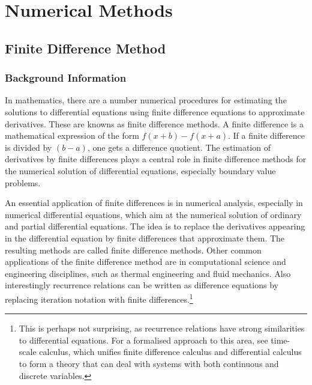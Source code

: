 \documentclass[aps,twocolumn,pre,nofootinbib,10pt]{revtex4-1}
\begin{document}


\section{Numerical Methods \label{sec:met}}

 
\subsection{Finite Difference Method}

\subsubsection{Background Information}

\par\hspace{4mm} In mathematics, there are a number numerical procedures for estimating the solutions to differential equations using finite difference equations to approximate derivatives. These are knowns as finite difference methods. A finite difference is a mathematical expression of the form \(f(x + b) - f(x + a)\). If a finite difference is divided by \((b - a)\), one gets a difference quotient. The estimation of derivatives by finite differences plays a central role in finite difference methods for the numerical solution of differential equations, especially boundary value problems.
\vspace{5mm} \par \indent An essential application of finite differences is in numerical analysis, especially in numerical differential equations, which aim at the numerical solution of ordinary and partial differential equations. The idea is to replace the derivatives appearing in the differential equation by finite differences that approximate them. The resulting methods are called finite difference methods. Other common applications of the finite difference method are in computational science and engineering disciplines, such as thermal engineering and fluid mechanics. Also interestingly recurrence relations can be written as difference equations by replacing iteration notation with finite differences.\footnote{This is perhaps not surprising, as recurrence relations have strong similarities to differential equations. For a formalised approach to this area, see time-scale calculus, which unifies finite difference calculus and differential calculus to form a theory that can deal with systems with both 
continuous and discrete variables.}
\end{document}

